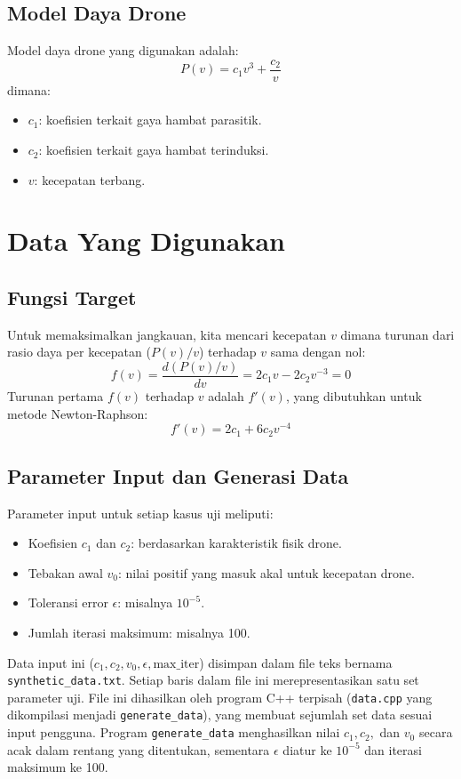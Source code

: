 \documentclass[conference]{IEEEtran}
\begin{document}
\subsection{Model Daya Drone}
Model daya drone yang digunakan adalah:
\begin{equation}
P(v) = c_1v^3 + \frac{c_2}{v}
\end{equation}
dimana:
\begin{itemize}
\item $c_1$: koefisien terkait gaya hambat parasitik.
\item $c_2$: koefisien terkait gaya hambat terinduksi.
\item $v$: kecepatan terbang.
\end{itemize}

\section{Data Yang Digunakan}
\subsection{Fungsi Target}
Untuk memaksimalkan jangkauan, kita mencari kecepatan $v$ dimana turunan dari rasio daya per kecepatan ($P(v)/v$) terhadap $v$ sama dengan nol:
\begin{equation}
f(v) = \frac{d(P(v)/v)}{dv} = 2c_1v - 2c_2v^{-3} = 0
\end{equation}
Turunan pertama $f(v)$ terhadap $v$ adalah $f'(v)$, yang dibutuhkan untuk metode Newton-Raphson:
\begin{equation}
f'(v) = 2c_1 + 6c_2v^{-4}
\end{equation}

\subsection{Parameter Input dan Generasi Data}
Parameter input untuk setiap kasus uji meliputi:
\begin{itemize}
    \item Koefisien $c_1$ dan $c_2$: berdasarkan karakteristik fisik drone.
    \item Tebakan awal $v_0$: nilai positif yang masuk akal untuk kecepatan drone.
    \item Toleransi error $\epsilon$: misalnya $10^{-5}$.
    \item Jumlah iterasi maksimum: misalnya 100.
\end{itemize}
Data input ini ($c_1, c_2, v_0, \epsilon, \text{max\_iter}$) disimpan dalam file teks bernama \texttt{synthetic\_data.txt}. Setiap baris dalam file ini merepresentasikan satu set parameter uji. File ini dihasilkan oleh program C++ terpisah (\texttt{data.cpp} yang dikompilasi menjadi \texttt{generate\_data}), yang membuat sejumlah set data sesuai input pengguna. Program \texttt{generate\_data} menghasilkan nilai $c_1, c_2,$ dan $v_0$ secara acak dalam rentang yang ditentukan, sementara $\epsilon$ diatur ke $10^{-5}$ dan iterasi maksimum ke 100.
\end{document}
